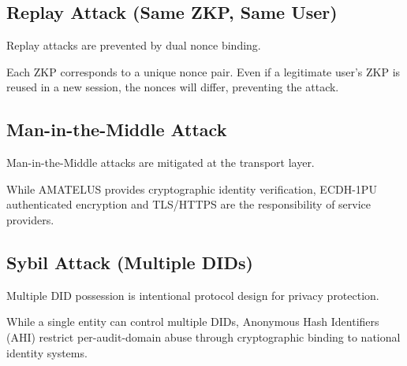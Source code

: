 \subsection{Replay Attack (Same ZKP, Same User)}

\begin{theorem}
  \label{thm:replay-resistance}
  Replay attacks are prevented by dual nonce binding.

  Each ZKP corresponds to a unique nonce pair. Even if a legitimate user's ZKP is
  reused in a new session, the nonces will differ, preventing the attack.
  \leanok
\end{theorem}

\subsection{Man-in-the-Middle Attack}

\begin{proposition}
  \label{prop:mitm-defense}
  Man-in-the-Middle attacks are mitigated at the transport layer.

  While AMATELUS provides cryptographic identity verification, ECDH-1PU authenticated
  encryption and TLS/HTTPS are the responsibility of service providers.
\end{proposition}

\subsection{Sybil Attack (Multiple DIDs)}

\begin{proposition}
  \label{prop:sybil-resilience}
  Multiple DID possession is intentional protocol design for privacy protection.

  While a single entity can control multiple DIDs, Anonymous Hash Identifiers (AHI)
  restrict per-audit-domain abuse through cryptographic binding to national identity systems.
\end{proposition}

